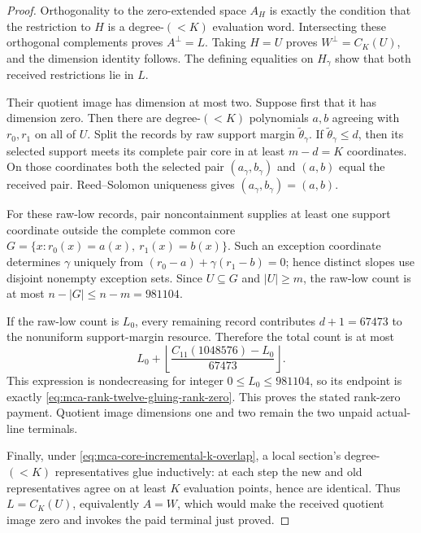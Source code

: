 \documentclass[11pt,a4paper]{amsart}
\numberwithin{equation}{section}
\theoremstyle{remark}
\begin{document}
\begin{proof}
Orthogonality to the zero-extended space \(A_H\) is exactly the condition
that the restriction to \(H\) is a degree-\((<K)\) evaluation word.
Intersecting these orthogonal complements proves \(A^\perp=L\).  Taking
\(H=U\) proves \(W^\perp=C_K(U)\), and the dimension identity follows.
The defining equalities on \(H_\gamma\) show that both received
restrictions lie in \(L\).

Their quotient image has dimension at most two.  Suppose first that it has
dimension zero.  Then there are degree-\((<K)\) polynomials \(a,b\) agreeing
with \(r_0,r_1\) on all of \(U\).  Split the records by raw support margin
\(\widetilde\theta_\gamma\).  If
\(\widetilde\theta_\gamma\le d\), then its selected support meets its
complete pair core in at least \(m-d=K\) coordinates.  On those coordinates
both the selected pair \((a_\gamma,b_\gamma)\) and \((a,b)\) equal the
received pair.  Reed--Solomon uniqueness gives
\((a_\gamma,b_\gamma)=(a,b)\).

For these raw-low records, pair noncontainment supplies at least one support
coordinate outside the complete common core
\(G=\{x:r_0(x)=a(x),\ r_1(x)=b(x)\}\).  Such an exception coordinate
determines \(\gamma\) uniquely from
\((r_0-a)+\gamma(r_1-b)=0\); hence distinct slopes use disjoint nonempty
exception sets.  Since \(U\subseteq G\) and \(|U|\ge m\), the raw-low count
is at most \(n-|G|\le n-m=981104\).

If the raw-low count is \(L_0\), every remaining record contributes
\(d+1=67473\) to the nonuniform support-margin resource.  Therefore the
total count is at most
\[
 L_0+
 \left\lfloor\frac{C_{11}(1048576)-L_0}{67473}\right\rfloor.
\]
This expression is nondecreasing for integer
\(0\le L_0\le981104\), so its endpoint is exactly
\eqref{eq:mca-rank-twelve-gluing-rank-zero}.  This proves the stated
rank-zero payment.  Quotient image dimensions one and two remain the two
unpaid actual-line terminals.

Finally, under \eqref{eq:mca-core-incremental-k-overlap}, a local section's
degree-\((<K)\) representatives glue inductively: at each step the new and
old representatives agree on at least \(K\) evaluation points, hence are
identical.  Thus \(L=C_K(U)\), equivalently \(A=W\), which would make the
received quotient image zero and invokes the paid terminal just proved.
\end{proof}
\end{document}
